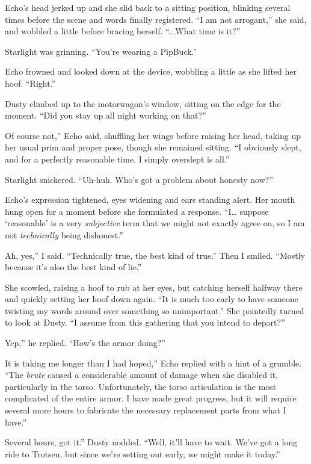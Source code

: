 Echo’s head jerked up and she slid back to a sitting position, blinking several times before the scene and words finally registered. “I am not arrogant,” she said, and wobbled a little before bracing herself. “...What time is it?”

Starlight was grinning. “You’re wearing a PipBuck.”

Echo frowned and looked down at the device, wobbling a little as she lifted her hoof. “Right.”

Dusty climbed up to the motorwagon’s window, sitting on the edge for the moment. “Did you stay up all night working on that?”

\leavevmode{}Of course not,” Echo said, shuffling her wings before raising her head, taking up her usual prim and proper pose, though she remained sitting. “I obviously slept, and for a perfectly reasonable time. I simply overslept is all.”

Starlight snickered. “Uh-huh. Who’s got a problem about honesty now?”

Echo’s expression tightened, eyes widening and ears standing alert. Her mouth hung open for a moment before she formulated a response. “I… suppose ‘reasonable’ is a very \textit{subjective} term that we might not exactly agree on, so I am not \textit{technically} being dishonest.”

\leavevmode{}Ah, yes,” I said. “Technically true, the best kind of true.” Then I smiled. “Mostly because it’s also the best kind of lie.”

She scowled, raising a hoof to rub at her eyes, but catching herself halfway there and quickly setting her hoof down again. “It is much too early to have someone twisting my words around over something so unimportant.” She pointedly turned to look at Dusty. “I assume from this gathering that you intend to depart?”

\leavevmode{}Yep,” he replied. “How’s the armor doing?”

\leavevmode{}It is taking me longer than I had hoped,” Echo replied with a hint of a grumble. “The \textit{brute} caused a considerable amount of damage when she disabled it, particularly in the torso. Unfortunately, the torso articulation is the most complicated of the entire armor. I have made great progress, but it will require several more hours to fabricate the necessary replacement parts from what I have.”

\leavevmode{}Several hours, got it.” Dusty nodded. “Well, it’ll have to wait. We’ve got a long ride to Trotsen, but since we’re setting out early, we might make it today.”

